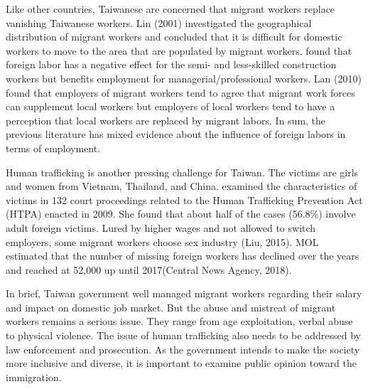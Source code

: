 \documentclass[12pt]{article}
\begin{document}
Like other countries, Taiwanese are concerned that migrant workers replace vanishing Taiwanese workers. Lin (2001) investigated the geographical distribution of migrant workers and concluded that it is difficult for domestic workers to move to the area that are populated by migrant workers. \cite{TsayLin2001} found that foreign labor has a negative effect for the semi- and less-skilled construction workers but benefits employment for managerial/professional workers. Lan (2010) found that employers of migrant workers tend to agree that migrant work forces can supplement local workers but employers of local workers tend to have a perception that local workers are replaced by migrant labors. In sum, the previous literature has mixed evidence about the influence of foreign labors in terms of employment.


Human trafficking is another pressing challenge for Taiwan. The victims are girls and women from Vietnam, Thailand, and China. \cite{Huang2017} examined the characteristics of victims in 132 court proceedings related to the Human Trafficking Prevention Act (HTPA) enacted in 2009. She found that about half of the cases (56.8\%) involve adult foreign victims. Lured by higher wages and not allowed to switch employers, some migrant workers choose sex industry (Liu, 2015). MOL estimated that the number of missing foreign workers has declined over the years and reached at 52,000 up until 2017(Central News Agency, 2018).


In brief, Taiwan government well managed migrant workers regarding their salary and impact on domestic job market. But the abuse and mistreat of migrant workers remains a serious issue. They range from age exploitation, verbal abuse to physical violence. The issue of human trafficking also needs to be addressed by law enforcement and prosecution. As the government intends to make the society more inclusive and diverse, it is important to examine public opinion toward the immigration.
\end{document}
